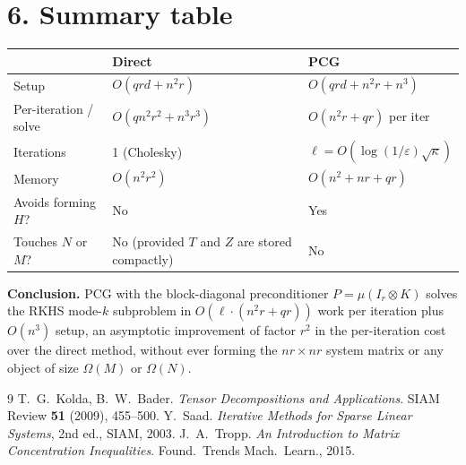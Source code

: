 \section*{6. Summary table}

\begin{center}\small
\begin{tabular}{@{}lll@{}}\toprule
 & Direct & PCG \\\midrule
Setup & $O(qrd+n^2r)$ & $O(qrd+n^2r+n^3)$ \\
Per-iteration / solve & $O(qn^2r^2+n^3r^3)$ & $O(n^2 r+qr)$ per iter \\
Iterations & 1 (Cholesky) & $\ell=O(\log(1/\varepsilon)\sqrt{\kappa})$ \\
Memory & $O(n^2r^2)$ & $O(n^2+nr+qr)$ \\
Avoids forming $H$? & No & Yes \\
Touches $N$ or $M$? & No (provided $T$ and $Z$ are stored compactly) & No \\
\bottomrule\end{tabular}\end{center}

\medskip
\noindent\textbf{Conclusion.}  PCG with the block-diagonal preconditioner $P=\mu(I_r\otimes K)$ solves the RKHS mode-$k$ subproblem in $O(\ell\cdot(n^2r+qr))$ work per iteration plus $O(n^3)$ setup, an asymptotic improvement of factor $r^2$ in the per-iteration cost over the direct method, without ever forming the $nr\times nr$ system matrix or any object of size $\Omega(M)$ or $\Omega(N)$.

\begin{thebibliography}{9}
 T.~G.~Kolda, B.~W.~Bader.  \emph{Tensor Decompositions and Applications}.  SIAM Review \textbf{51} (2009), 455--500.
 Y.~Saad.  \emph{Iterative Methods for Sparse Linear Systems}, 2nd ed., SIAM, 2003.
 J.~A.~Tropp.  \emph{An Introduction to Matrix Concentration Inequalities}.  Found.\ Trends Mach.\ Learn., 2015.
\end{thebibliography}


